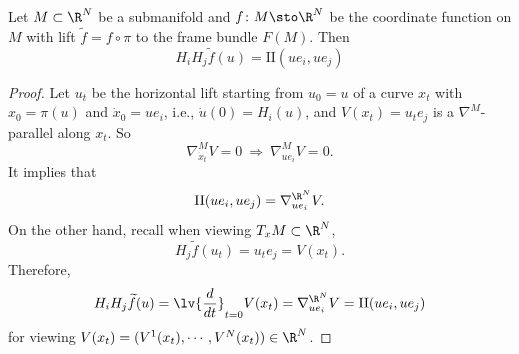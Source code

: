 \begin{lem}
    Let $M \subset \R^N$ be a submanifold and $f \colon M \sto \R^N$ be the coordinate function on $M$ with lift $\widetilde{f} = f \circ \pi$ to the frame bundle $F(M)$. Then
    \begin{equation*}
        H_iH_j \widetilde{f}(u) = \mathrm{II}(ue_i,ue_j)
    \end{equation*}
\end{lem}
\begin{proof}
    Let $u_t$ be the horizontal lift starting from $u_0 = u$ of a curve $x_t$ with $x_0 = \pi(u)$ and $\dot{x}_0 = ue_i$, i.e., $\dot{u}(0)=H_i(u)$, and $V(x_t) = u_te_j$ is a $\nabla^M$-parallel along $x_t$. So 
    \begin{equation*}
        \nabla^M_{\dot{x}_t} V = 0~\Rightarrow~ \nabla^M_{ue_i}V = 0.
    \end{equation*}
    It implies that
    \begin{equation*}
        \mathrm{II}(ue_i,ue_j) = \nabla^{\R^N}_{ue_i}V.
    \end{equation*}
    On the other hand, recall when viewing $T_xM \subset \R^N$,
    \begin{equation*}
        H_j \widetilde{f}(u_t) = u_te_j = V(x_t).
    \end{equation*}
    Therefore,
    \begin{equation*}
        H_iH_j\widetilde{f}(u) = \lv{\frac{d}{dt}}_{t = 0} V(x_t) = \nabla^{\R^N}_{ue_i}V = \mathrm{II}(ue_i,ue_j)
    \end{equation*}
    for viewing $V(x_t) = (V^1(x_t),\cdots,V^N(x_t)) \in \R^N$. \qedhere
\end{proof}

